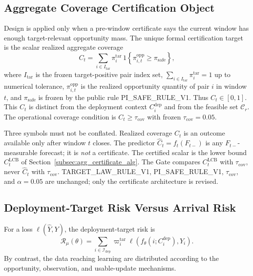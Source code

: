 \documentclass[letterpaper,journal]{IEEEtran}
\begin{document}
\subsection{Aggregate Coverage Certification Object}
\label{subsec:agg_coverage_object}

Design is applied only when a pre-window certificate says the current window
has enough target-relevant opportunity mass.  The unique formal certification
target is the scalar realized aggregate coverage
\begin{equation}
 C_t
 =
 \sum_{i\in I_{\mathrm{tar}}}
 \pi_i^{\mathrm{tar}}
 \,
 1\!\left\{\pi_{i,t}^{\mathrm{opp}}\ge\pi_{\mathrm{safe}}\right\},
 \label{eq:agg_Ct}
\end{equation}
where $I_{\mathrm{tar}}$ is the frozen target-positive pair index set,
$\sum_{i\in I_{\mathrm{tar}}}\pi_i^{\mathrm{tar}}=1$ up to numerical tolerance,
$\pi_{i,t}^{\mathrm{opp}}$ is the realized opportunity quantity of pair $i$ in
window $t$, and $\pi_{\mathrm{safe}}$ is frozen by the public rule
PI\_SAFE\_RULE\_V1.  Thus $C_t\in[0,1]$.  This $C_t$ is distinct from the
deployment context $C_i^{\mathrm{dep}}$ and from the feasible set
$\mathcal{C}_r$.  The operational coverage condition is
$C_t\ge\tau_{\mathrm{cov}}$ with frozen $\tau_{\mathrm{cov}}=0.05$.

Three symbols must not be conflated.  Realized coverage $C_t$ is an outcome
available only after window $t$ closes.  The predictor
$\widehat C_t=f_t(F_{t-})$ is any $F_{t-}$-measurable forecast; it is
\emph{not} a certificate.  The certified scalar is the lower bound
$C^{\mathrm{LCB}}_t$ of Section~\ref{subsec:agg_certificate_alg}.  The Gate
compares $C^{\mathrm{LCB}}_t$ with $\tau_{\mathrm{cov}}$, never
$\widehat C_t$ with $\tau_{\mathrm{cov}}$.  TARGET\_LAW\_RULE\_V1,
PI\_SAFE\_RULE\_V1, $\tau_{\mathrm{cov}}$, and $\alpha=0.05$ are unchanged;
only the certificate architecture is revised.

\subsection{Deployment-Target Risk Versus Arrival Risk}
\label{subsec:target_risk}

For a loss $\ell(\widehat Y,Y)$, the deployment-target risk is
\begin{equation}
 \mathcal{R}_{\mu}(\theta)
 =
 \sum_{i\in\mathcal{I}_{\mathrm{dep}}}
 \varpi_i^{\mathrm{tar}}
 \ell\!\left(
 f_{\theta}(i;C_i^{\mathrm{dep}}),Y_i
 \right).
 \label{eq:target_risk}
\end{equation}
By contrast, the data reaching learning are distributed according to the
opportunity, observation, and usable-update mechanisms.
\end{document}
